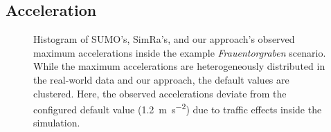\subsection{Acceleration}
\label{subsec:acceleration_evaluation}
\begin{figure}
    \vspace{-1.5em}
    \centering
    \hfill
    \caption{%
        Histogram of SUMO's, SimRa's, and our approach's observed maximum accelerations inside the example \textit{Frauentorgraben} scenario.
        While the maximum accelerations are heterogeneously distributed in the real-world data and our approach, the default values are clustered.
        Here, the observed accelerations deviate from the configured default value (\SI{1.2}{\metre\per\square\second}) due to traffic effects inside the simulation.
    }%
    \label{fig:eval_acc}
\end{figure}


